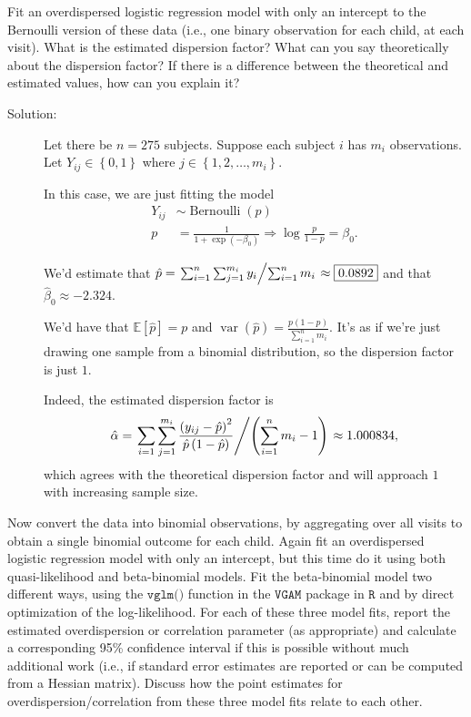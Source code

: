 \documentclass[11pt, letterpaper]{article}
\begin{document}
\begin{enumerate}[(a)]
{\em \item Fit an overdispersed logistic regression model with only an intercept to the Bernoulli version of these data (i.e., one binary observation for each child, at each visit).  What is the estimated dispersion factor?  What can you say theoretically about the dispersion factor?  If there is a difference between the theoretical
  and estimated values, how can you explain it?}

\begin{description}
\item[Solution:] Let there be $n = 275$ subjects. Suppose each subject $i$ has
  $m_i$ observations. Let $Y_{ij} \in \left\{0, 1\right\}$ where
  $j \in \left\{1,2,\ldots,m_i\right\}.$

  In this case, we are just fitting the model
  \begin{align*}
    Y_{ij}
    &\sim \operatorname{Bernoulli}\left(p\right) \\
    p
    &= \frac{1}{1 + \exp\left(-\beta_0\right)}
    \Rightarrow  \log\frac{p}{1 - p}
    = \beta_0.
  \end{align*}
  
  We'd estimate that
  $\hat{p} = \left.\sum_{i=1}^n\sum_{j=1}^{m_i}y_i\middle/\sum_{i=1}^n
    m_i\right. \approx \boxed{0.0892}$ and that $\hat{\beta}_0 \approx -2.324$.

  We'd have that $\mathbb{E}\left[\hat{p}\right] = p$ and
  $\operatorname{var}\left(\hat{p}\right) = \frac{p\left(1 -
      p\right)}{\sum_{i=1}^{n}m_i}.$ It's as if we're just drawing one sample
  from a binomial distribution, so the dispersion factor is just $1$.

  Indeed, the estimated dispersion factor is
  \begin{equation*}
    \hat{\alpha} =
    \left.
      \sum_{i=1}\sum_{j=1}^{m_i} \frac{\left(y_{ij} - \hat{p}\right)^2}{\hat{p}\left(1 - \hat{p}\right)}
      \middle/\left(
      \sum_{i=1}^n m_i - 1\right)
      \right. \approx 1.000834,
    \end{equation*}
    which agrees with the theoretical dispersion factor and will approach $1$
    with increasing sample size.
\end{description}

{\em \item Now convert the data into binomial observations, by aggregating over all visits to obtain a single
binomial outcome for each child.  Again fit an overdispersed logistic regression model with only an intercept, but this time do it using both quasi-likelihood and beta-binomial models.  Fit the beta-binomial model two 
different ways,
using the $\texttt{vglm()}$ function in the $\texttt{VGAM}$ package in $\texttt{R}$
and by direct optimization of the log-likelihood.  For each
of these three model fits, report the estimated overdispersion or correlation parameter (as appropriate) and
calculate a corresponding 95\% confidence interval if this is possible without much additional work (i.e., if standard error
estimates are reported or can be computed from a Hessian matrix).  Discuss how the point estimates for overdispersion/correlation from these three model fits relate to each other.}


\end{enumerate}
\end{document}
